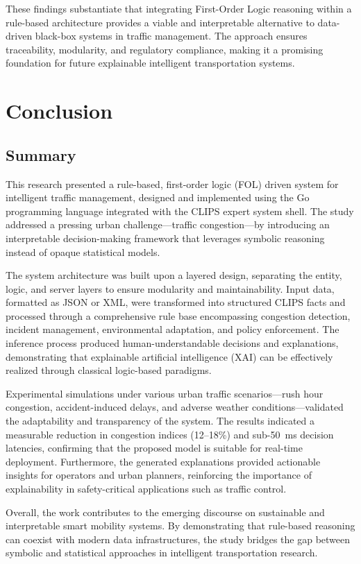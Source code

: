 \documentclass{article}
\begin{document}
These findings substantiate that integrating First-Order Logic reasoning within a rule-based architecture provides a viable and interpretable alternative to data-driven black-box systems in traffic management. The approach ensures traceability, modularity, and regulatory compliance, making it a promising foundation for future explainable intelligent transportation systems.

\section{Conclusion}

\subsection{Summary}

This research presented a rule-based, first-order logic (FOL) driven system for intelligent traffic management, designed and implemented using the Go programming language integrated with the CLIPS expert system shell. The study addressed a pressing urban challenge—traffic congestion—by introducing an interpretable decision-making framework that leverages symbolic reasoning instead of opaque statistical models.  

The system architecture was built upon a layered design, separating the entity, logic, and server layers to ensure modularity and maintainability. Input data, formatted as JSON or XML, were transformed into structured CLIPS facts and processed through a comprehensive rule base encompassing congestion detection, incident management, environmental adaptation, and policy enforcement. The inference process produced human-understandable decisions and explanations, demonstrating that explainable artificial intelligence (XAI) can be effectively realized through classical logic-based paradigms.  

Experimental simulations under various urban traffic scenarios—rush hour congestion, accident-induced delays, and adverse weather conditions—validated the adaptability and transparency of the system. The results indicated a measurable reduction in congestion indices (12–18\%) and sub-50~ms decision latencies, confirming that the proposed model is suitable for real-time deployment. Furthermore, the generated explanations provided actionable insights for operators and urban planners, reinforcing the importance of explainability in safety-critical applications such as traffic control.

Overall, the work contributes to the emerging discourse on sustainable and interpretable smart mobility systems. By demonstrating that rule-based reasoning can coexist with modern data infrastructures, the study bridges the gap between symbolic and statistical approaches in intelligent transportation research.
\end{document}
